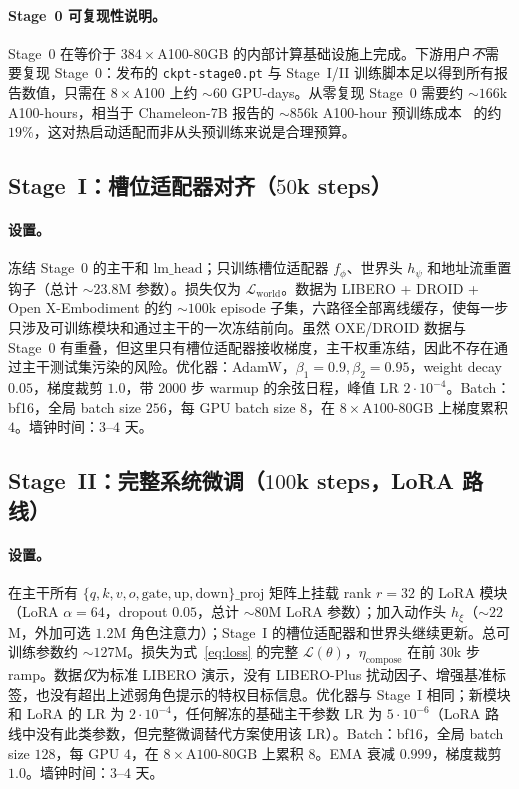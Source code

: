 \paragraph{Stage~0 可复现性说明。}
Stage~0 在等价于 $384\!\times\!$A100-80GB 的内部计算基础设施上完成。下游用户\emph{不}需要复现 Stage~0：发布的 \texttt{ckpt-stage0.pt} 与 Stage~I/II 训练脚本足以得到所有报告数值，只需在 $8\!\times\!$A100 上约 $\sim\!60$ GPU-days。从零复现 Stage~0 需要约 $\sim\!166$k A100-hours，相当于 Chameleon-7B 报告的 $\sim\!856$k A100-hour 预训练成本~\citep{chameleon} 的约 $19\%$，这对热启动适配而非从头预训练来说是合理预算。

\subsection*{Stage~I：槽位适配器对齐（$50$k steps）}

\paragraph{设置。}
冻结 Stage~0 的主干和 $\mathrm{lm\_head}$；只训练槽位适配器 $f_\phi$、世界头 $h_\psi$ 和地址流重置钩子（总计 $\sim\!23.8$M 参数）。损失仅为 $\mathcal{L}_\mathrm{world}$。数据为 LIBERO + DROID + Open X-Embodiment 的约 $\sim\!100$k episode 子集，六路径全部离线缓存，使每一步只涉及可训练模块和通过主干的一次冻结前向。虽然 OXE/DROID 数据与 Stage~0 有重叠，但这里只有槽位适配器接收梯度，主干权重冻结，因此不存在通过主干测试集污染的风险。优化器：AdamW，$\beta_1\!=\!0.9,\beta_2\!=\!0.95$，weight decay $0.05$，梯度裁剪 $1.0$，带 $2000$ 步 warmup 的余弦日程，峰值 LR $2\!\cdot\!10^{-4}$。Batch：bf16，全局 batch size $256$，每 GPU batch size $8$，在 $8\!\times\!\text{A100-80GB}$ 上梯度累积 $4$。墙钟时间：$3$--$4$ 天。

\subsection*{Stage~II：完整系统微调（$100$k steps，LoRA 路线）}

\paragraph{设置。}
在主干所有 $\{q,k,v,o,\mathrm{gate},\mathrm{up},\mathrm{down}\}\text{\_proj}$ 矩阵上挂载 rank $r{=}32$ 的 LoRA 模块（LoRA $\alpha\!=\!64$，dropout $0.05$，总计 $\sim\!80$M LoRA 参数）；加入动作头 $h_\xi$（$\sim\!22$M，外加可选 $1.2$M 角色注意力）；Stage~I 的槽位适配器和世界头继续更新。总可训练参数约 $\sim\!127$M。损失为式~\eqref{eq:loss} 的完整 $\mathcal{L}(\theta)$，$\eta_\mathrm{compose}$ 在前 $30$k 步 ramp。数据\emph{仅}为标准 LIBERO 演示，没有 LIBERO-Plus 扰动因子、增强基准标签，也没有超出上述弱角色提示的特权目标信息。优化器与 Stage~I 相同；新模块和 LoRA 的 LR 为 $2\!\cdot\!10^{-4}$，任何解冻的基础主干参数 LR 为 $5\!\cdot\!10^{-6}$（LoRA 路线中没有此类参数，但完整微调替代方案使用该 LR）。Batch：bf16，全局 batch size $128$，每 GPU $4$，在 $8\!\times\!\text{A100-80GB}$ 上累积 $8$。EMA 衰减 $0.999$，梯度裁剪 $1.0$。墙钟时间：$3$--$4$ 天。

